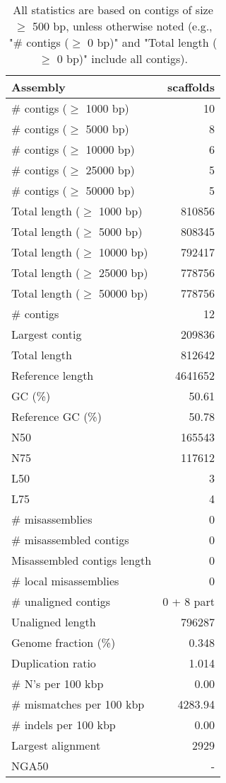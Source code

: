 \documentclass[12pt,a4paper]{article}
\begin{document}
\begin{table}[ht]
\begin{center}
\caption{All statistics are based on contigs of size $\geq$ 500 bp, unless otherwise noted (e.g., "\# contigs ($\geq$ 0 bp)" and "Total length ($\geq$ 0 bp)" include all contigs).}
\begin{tabular}{|l*{1}{|r}|}
\hline
Assembly & scaffolds \\ \hline
\# contigs ($\geq$ 1000 bp) & 10 \\ \hline
\# contigs ($\geq$ 5000 bp) & 8 \\ \hline
\# contigs ($\geq$ 10000 bp) & 6 \\ \hline
\# contigs ($\geq$ 25000 bp) & 5 \\ \hline
\# contigs ($\geq$ 50000 bp) & 5 \\ \hline
Total length ($\geq$ 1000 bp) & 810856 \\ \hline
Total length ($\geq$ 5000 bp) & 808345 \\ \hline
Total length ($\geq$ 10000 bp) & 792417 \\ \hline
Total length ($\geq$ 25000 bp) & 778756 \\ \hline
Total length ($\geq$ 50000 bp) & 778756 \\ \hline
\# contigs & 12 \\ \hline
Largest contig & 209836 \\ \hline
Total length & 812642 \\ \hline
Reference length & 4641652 \\ \hline
GC (\%) & 50.61 \\ \hline
Reference GC (\%) & 50.78 \\ \hline
N50 & 165543 \\ \hline
N75 & 117612 \\ \hline
L50 & 3 \\ \hline
L75 & 4 \\ \hline
\# misassemblies & 0 \\ \hline
\# misassembled contigs & 0 \\ \hline
Misassembled contigs length & 0 \\ \hline
\# local misassemblies & 0 \\ \hline
\# unaligned contigs & 0 + 8 part \\ \hline
Unaligned length & 796287 \\ \hline
Genome fraction (\%) & 0.348 \\ \hline
Duplication ratio & 1.014 \\ \hline
\# N's per 100 kbp & 0.00 \\ \hline
\# mismatches per 100 kbp & 4283.94 \\ \hline
\# indels per 100 kbp & 0.00 \\ \hline
Largest alignment & 2929 \\ \hline
NGA50 & - \\ \hline
\end{tabular}
\end{center}
\end{table}
\end{document}
